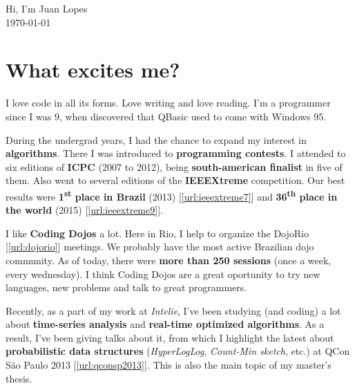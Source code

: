 \documentclass[a4paper,12pt,oneside]{article}
\begin{document}
\author{Juan Lopes}

\begin{center}
	{\huge Hi, I'm Juan Lopes} \\[0.5cm]

	{\large \today}
\end{center}


\renewcommand{\abstractname}{}
\begin{abstract}
\noindent \begin{center}\textit{
Brazilian, lives in Rio de Janeiro. \\
Interested in algorithms, optimization, programming contests and serif typefaces. \\
B.S. in Computer Science; M.S. candidate in Computer Science. \\
Writes high-performance Java code at Intelie for the last 4 years. \\
Wrote beautiful C\# code at Living Consultoria for the 4 years before.
}
\end{center}
\end{abstract}


\section*{What excites me?}

	I love code in all its forms. Love writing and love reading. I'm a programmer
	since I was 9, when discovered that QBasic used to come with Windows 95.

	During the undergrad years, I had the chance to expand my interest in
	\textbf{algorithms}. There I was introduced to \textbf{programming contests}. I
	attended to six editions of \textbf{ICPC} (2007 to 2012), being
	\textbf{south-american finalist} in five of them. Also went to several editions of
	the \textbf{IEEEXtreme} competition. Our best results were \textbf{1\textsuperscript{st} place in Brazil} (2013) [\ref{url:ieeextreme7}]
	and \textbf{36\textsuperscript{th} place in the world} (2015) [\ref{url:ieeextreme9}].

	I like \textbf{Coding Dojos} a lot. Here in Rio, I help to organize the DojoRio
	[\ref{url:dojorio}] meetings. We probably have the most active Brazilian dojo
	community. As of today, there were \textbf{more than 250 sessions} (once a
	week, every wednesday). I think Coding Dojos are a great oportunity to try new
	languages, new problems and talk to great programmers.

	Recently, as a part of my work at \emph{Intelie}, I've been studying (and
	coding) a lot about \textbf{time-series analysis} and \textbf{real-time
	optimized algorithms}. As a result, I've been giving talks about it, from which
	I highlight the latest about \textbf{probabilistic data structures} (\emph{HyperLogLog}, \emph{Count-Min sketch}, etc.) at QCon São
	Paulo 2013 [\ref{url:qconsp2013}]. This is also the main topic of my master's thesis.
\end{document}
